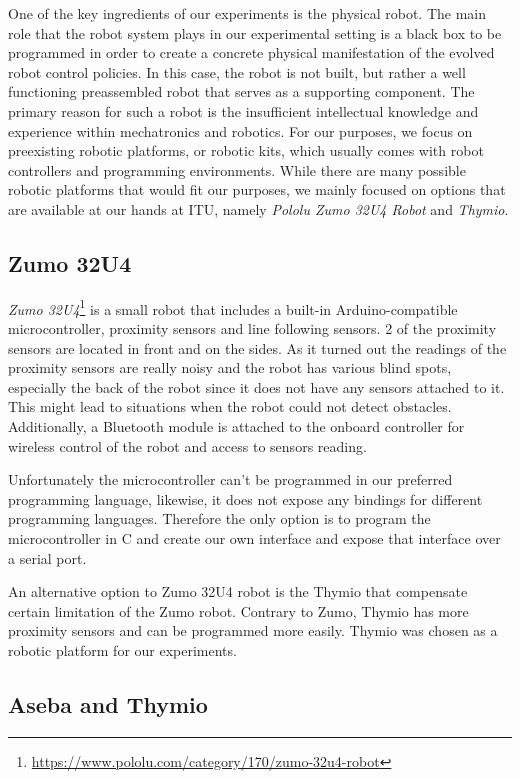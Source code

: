 \documentclass[format=acmsmall, review=false, screen=true]{acmart}
\begin{document}
One of the key ingredients of our experiments is the physical robot. The main role that the robot system plays in our experimental setting is a black box to be programmed in order to create a concrete physical manifestation of the evolved robot control policies. In this case, the robot is not built, but rather a well functioning preassembled robot that serves as a supporting component. The primary reason for such a robot is the insufficient intellectual knowledge and experience within mechatronics and robotics. For our purposes, we focus on preexisting robotic platforms, or robotic kits, which usually comes with robot controllers and programming environments. While there are many possible robotic platforms that would fit our purposes, we mainly focused on options that are available at our hands at ITU, namely \emph{Pololu Zumo 32U4 Robot} and \emph{Thymio}.

\subsection{Zumo 32U4}

\emph{Zumo 32U4}\footnote{\url{https://www.pololu.com/category/170/zumo-32u4-robot}} is a small robot that includes a built-in Arduino-compatible microcontroller, proximity sensors and line following sensors. 2 of the proximity sensors are located in front and on the sides. As it turned out the readings of the proximity sensors are really noisy and the robot has various blind spots, especially the back of the robot since it does not have any sensors attached to it. This might lead to situations when the robot could not detect obstacles. Additionally, a Bluetooth module is attached to the onboard controller for wireless control of the robot and access to sensors reading.

Unfortunately the microcontroller can't be programmed in our preferred programming language, likewise, it does not expose any bindings for different programming languages. Therefore the only option is to program the microcontroller in C and create our own interface and expose that interface over a serial port.

An alternative option to Zumo 32U4 robot is the Thymio that compensate certain limitation of the Zumo robot. Contrary to Zumo, Thymio has more proximity sensors and can be programmed more easily. Thymio was chosen as a robotic platform for our experiments.

\subsection{Aseba and Thymio}
\end{document}
